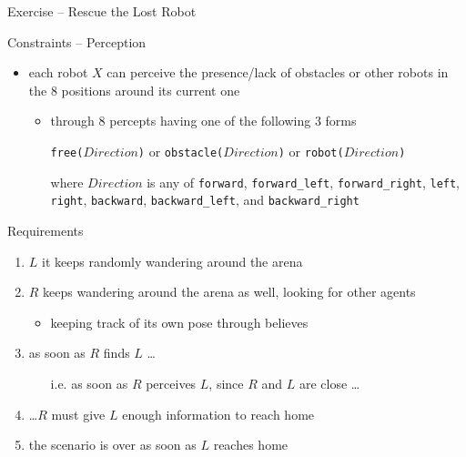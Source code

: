 \documentclass[presentation]{beamer}\mode<presentation>{\usetheme{AMSBolognaFC}}
\begin{document}
\begin{frame}[c, allowframebreaks]{Exercise \theJasonExample{} -- Rescue the Lost Robot}
\begin{exampleblock}{Constraints -- Perception}
\begin{itemize}
            \item each robot $X$ can perceive the presence/lack of \alert{obstacles} or \alert{other robots} in the 8 positions around its current one
            \begin{itemize}
                \item through 8 percepts having one of the following 3 forms
                \begin{center}
                    \texttt{free($Direction$)} or \texttt{obstacle($Direction$)} or \texttt{robot($Direction$)}
                \end{center}
                where $Direction$ is any of \texttt{forward}, \texttt{forward\_left}, \texttt{forward\_right}, \texttt{left}, \texttt{right}, \texttt{backward}, \texttt{backward\_left}, and \texttt{backward\_right}
            \end{itemize}
        \end{itemize}
    \end{exampleblock}

    \begin{alertblock}{Requirements}
        \begin{enumerate}
            \item $L$ it keeps randomly wandering around the arena
            
            \item $R$ keeps wandering around the arena as well, looking for other agents
            \begin{itemize}
                \item keeping track of its own pose through believes
            \end{itemize}
            
            \item as soon as $R$ finds $L$ \ldots
            \begin{itemize}
                \item[i.e.] as soon as $R$ perceives $L$, since $R$ and $L$ are close \ldots
            \end{itemize}
        
            \item \ldots $R$ must give $L$ enough information to reach home
            
            \item the scenario is over as soon as $L$ reaches home
        \end{enumerate}
    \end{alertblock}
    
\end{frame} 
\end{document}
